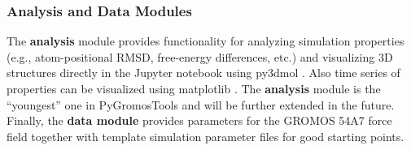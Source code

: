\subsubsection{Analysis and Data Modules}
The \textbf{analysis} module provides functionality for analyzing simulation properties (e.g., atom-positional RMSD, free-energy differences, etc.) and visualizing 3D structures directly in the Jupyter notebook using py3dmol \cite{Rego2014}. Also time series of properties can be visualized using matplotlib \cite{Hunter2007}. The \textbf{analysis} module is the ``youngest'' one in PyGromosTools and will be further extended in the future. 
Finally, the \textbf{data module} provides parameters for the GROMOS 54A7 force field \cite{Schmid2011} together with template simulation parameter files for good starting points.


\FloatBarrier